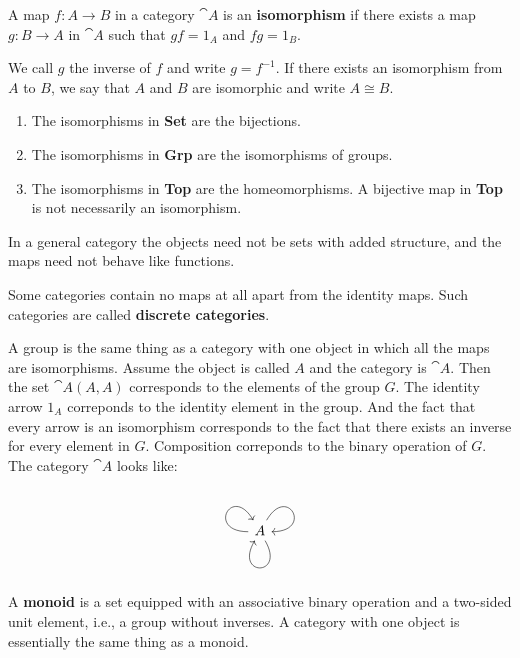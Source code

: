 \begin{definition}
    A map $f: A\to B$ in a category $\cat{A}$ is an \textbf{isomorphism} if there exists a map $g: B \to A$ in $\cat{A}$ such that $gf=1_A$ and $fg=1_B$.
\end{definition}
We call $g$ the inverse of $f$ and write $g=f^{-1}$. If there exists an isomorphism from $A$ to $B$, we say that $A$ and $B$ are isomorphic and write $A \cong B$. 

\begin{example}[Categories]\leavevmode
    \begin{enumerate}[label=(\alph*)]
        \item The isomorphisms in \textbf{Set} are the bijections. 
        \item The isomorphisms in \textbf{Grp} are the isomorphisms of groups.
        \item The isomorphisms in \textbf{Top} are the homeomorphisms. A bijective map in \textbf{Top} is not necessarily an isomorphism.
    \end{enumerate}
\end{example}

In a general category the objects need not be sets with added structure, and the maps need not behave like functions.

Some categories contain no maps at all apart from the identity maps. Such categories are called \textbf{discrete categories}.

A group is the same thing as a category with one object in which all the maps are isomorphisms. Assume the object is called $A$ and the category is $\cat{A}$. Then the set $\cat{A}(A,A)$ corresponds to the elements of the group $G$. The identity arrow $1_A$ correponds to the identity element in the group. And the fact that every arrow is an isomorphism corresponds to the fact that there exists an inverse for every element in $G$. Composition correponds to the binary operation of $G$. The category $\cat{A}$ looks like:
\begin{equation*}
\begin{tikzcd}
    A \arrow[in=0, out=60, distance=3em, ""]
    \arrow[in=120, out=180, distance=3em, ""]
    \arrow[in=240, out=300, distance=3em, ""]
\end{tikzcd}
\end{equation*}

A \textbf{monoid} is a set equipped with an associative binary operation and a two-sided unit element, i.e., a group without inverses. A category with one object is essentially the same thing as a monoid.

